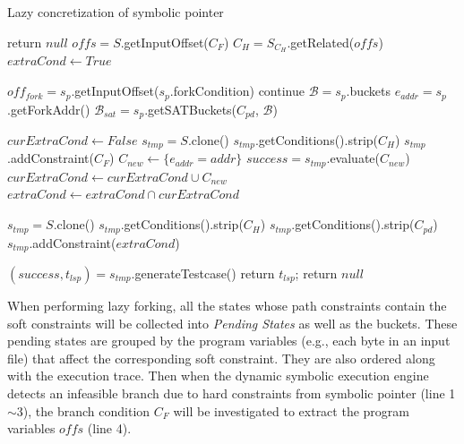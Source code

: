\documentclass{cta-author}
\begin{document}
\begin{algorithm}
	\LinesNumbered
	\caption{Lazy concretization of symbolic pointer}
	\label{LCSP}
	{
		return $null$\;
	}
	$offs = S$.getInputOffset($C_F$)\;
	$C_H = S_{C_H}$.getRelated($offs$)\;
	$extraCond\leftarrow True$\;
	{
		$off_{fork} = s_p$.getInputOffset($s_p$.forkCondition)\;
		{continue\;}
		$\mathcal{B}=s_p$.buckets\;
		$e_{addr} = s_p$.getForkAddr()\;
		$\mathcal{B}_{sat}=s_p$.getSATBuckets($C_{pd}$, $\mathcal{B}$)\;
		
		$curExtraCond\leftarrow False$\;
		{
			$s_{tmp} = S$.clone()\;
			$s_{tmp}$.getConditions().strip($C_H$)\;
			$s_{tmp}$.addConstraint($C_F$)\;
			$C_{new}\leftarrow \{e_{addr}=addr\}$\;
			$success = s_{tmp}$.evaluate($C_{new}$)\;
			{$curExtraCond\leftarrow curExtraCond\cup C_{new}$\;}
		}
		$extraCond\leftarrow extraCond\cap curExtraCond$\;
	}
	
	$s_{tmp} = S$.clone()\;
	$s_{tmp}$.getConditions().strip($C_H$)\;
	$s_{tmp}$.getConditions().strip($C_{pd}$)\;
	$s_{tmp}$.addConstraint($extraCond$)\;
	
	$(success, t_{lsp}) = s_{tmp}$.generateTestcase()\;
	{
		return $t_{lsp}$;
	}
	return $null$\;
\end{algorithm}

When performing lazy forking, all the states whose path constraints 
contain the soft constraints will be collected into \emph{Pending States}
as well as the buckets. 
These pending states are grouped by the program variables (e.g., each 
byte in an input file) that affect the corresponding soft constraint. 
They are also ordered along with the execution trace.
Then when the dynamic symbolic execution engine detects an infeasible 
branch due to hard constraints from symbolic pointer (line 1$\sim$3), 
the branch condition $C_F$ will be 
investigated to extract the program variables $offs$ (line 4).
\end{document}
